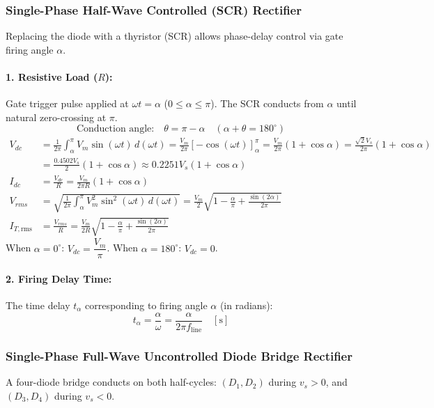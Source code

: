 \subsubsection{Single-Phase Half-Wave Controlled (SCR) Rectifier}
Replacing the diode with a thyristor (SCR) allows phase-delay control via gate firing angle $\alpha$.

\paragraph{1. Resistive Load ($R$):}
Gate trigger pulse applied at $\omega t = \alpha$ ($0 \le \alpha \le \pi$). The SCR conducts from $\alpha$ until natural zero-crossing at $\pi$.
\begin{equation}
\text{Conduction angle:} \quad \theta = \pi - \alpha \quad (\alpha + \theta = 180^\circ)
\end{equation}
\begin{align}
V_{dc} &= \frac{1}{2\pi}\int_\alpha^\pi V_m \sin(\omega t)\,d(\omega t) = \frac{V_m}{2\pi}\left[-\cos(\omega t)\right]_\alpha^\pi = \frac{V_m}{2\pi}(1 + \cos\alpha) = \frac{\sqrt{2} V_s}{2\pi}(1 + \cos\alpha) \\
&= \frac{0.4502 V_s}{2}(1 + \cos\alpha) \approx 0.2251 V_s (1 + \cos\alpha) \\
I_{dc} &= \frac{V_{dc}}{R} = \frac{V_m}{2\pi R}(1 + \cos\alpha) \\
V_{rms} &= \sqrt{\frac{1}{2\pi}\int_\alpha^\pi V_m^2 \sin^2(\omega t)\,d(\omega t)} = \frac{V_m}{2}\sqrt{1 - \frac{\alpha}{\pi} + \frac{\sin(2\alpha)}{2\pi}} \\
I_{T,\mathrm{rms}} &= \frac{V_{rms}}{R} = \frac{V_m}{2R}\sqrt{1 - \frac{\alpha}{\pi} + \frac{\sin(2\alpha)}{2\pi}}
\end{align}
When $\alpha = 0^\circ$: $V_{dc} = \dfrac{V_m}{\pi}$. When $\alpha = 180^\circ$: $V_{dc} = 0$.

\paragraph{2. Firing Delay Time:}
The time delay $t_\alpha$ corresponding to firing angle $\alpha$ (in radians):
\begin{equation}
t_\alpha = \frac{\alpha}{\omega} = \frac{\alpha}{2\pi f_{\mathrm{line}}} \quad [\si{\second}]
\end{equation}

\subsubsection{Single-Phase Full-Wave Uncontrolled Diode Bridge Rectifier}
A four-diode bridge conducts on both half-cycles: $(D_1, D_2)$ during $v_s > 0$, and $(D_3, D_4)$ during $v_s < 0$.

